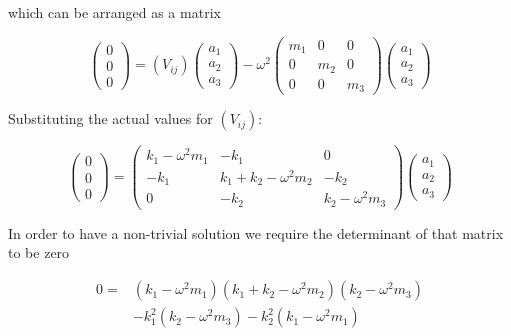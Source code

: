 which can be arranged as a matrix

\begin{equation}
  \left( 
    \begin{array}{c} 
      0\\ 0\\ 0 
    \end{array}
  \right) = (V_{ij}) \left(
    \begin{array}{c}
      a_1 \\ a_2 \\ a_3 
    \end{array}
  \right) - \omega^2 \left(
    \begin{array}{ccc}
      m_1 & 0 & 0 \\ 0 & m_2 & 0 \\ 0 & 0 & m_3
    \end{array}\right) \left(
    \begin{array}{c} 
      a_1 \\ a_2 \\ a_3 
    \end{array}
  \right)
\end{equation}

Substituting the actual values for $(V_{ij})$:

\begin{equation}
  \left( 
    \begin{array}{c}
      0\\ 0\\ 0
    \end{array}
  \right) 
  = \left(
    \begin{array}{ccc}
      k_1-\omega^2m_1 & -k_1 & 0 \\ -k_1 & k_1+k_2-\omega^2m_2 & -k_2 \\ 0 & -k_2 & k_2-\omega^2m_3 
    \end{array}
  \right) 
  \left(
    \begin{array}{c}
      a_1 \\ a_2 \\ a_3 
    \end{array}
  \right)
\end{equation}

In order to have a non-trivial solution we require the determinant of that matrix to be zero

\begin{equation}
  \label{eq:det}
  \begin{split}
    0 = & (k_1-\omega^2m_1)(k_1+k_2-\omega^2m_2)(k_2-\omega^2m_3) \\
        & -k_1^2(k_2-\omega^2m_3)-k_2^2(k_1-\omega^2m_1)
  \end{split}
\end{equation}

